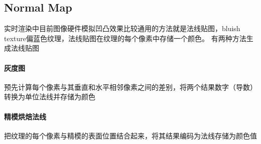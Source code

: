 \subsection{Normal Map}

实时渲染中目前图像硬件模拟凹凸效果比较通用的方法就是法线贴图，bluish texture偏蓝色纹理，法线贴图在纹理的每个像素中存储一个颜色。
有两种方法生成法线贴图
\paragraph{灰度图}
预先计算每个像素与其垂直和水平相邻像素之间的差别，将两个结果数字（导数）转换为单位法线并存储为颜色
\paragraph{精模烘焙法线}
把纹理的每个像素与精模的表面位置结合起来，将其结果编码为法线存储为颜色值

